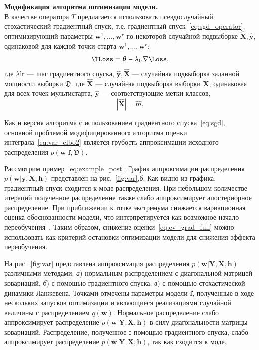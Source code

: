 \textbf{Модификация алгоритма оптимизации модели.} \\
В качестве оператора $T$ предлагается использовать псевдослучайный стохастический градиентный спуск, т.е. градиентный спуск~\eqref{eq:sgd_operator}, оптимизирующий параметры $\mathbf{w}^1,\dots,\mathbf{w}^r$ по некоторой случайной подвыборке $\hat{\mathbf{X}}, \hat{\mathbf{y}}$, одинаковой для каждой точки старта $\mathbf{w}^1,\dots,\mathbf{w}^r$:
\[
    \TLoss = \boldsymbol{\theta} - \lambda_{\text{lr}}\nabla \Loss,
\]
где $\lambda{\text{lr}}$ --- шаг градиентного спуска, $\hat{\mathbf{y}}, \hat{\mathbf{X}}$ --- случайная подвыборка заданной мощности выборки $\mathfrak{D}$.
где $\hat{\mathbf{X}}$ --- случайная подвыборка выборки ${\mathbf{X}}$, одинаковая для всех точек мультистарта, $\hat{\mathbf{y}}$ --- соответствующие метки классов, $$|\hat{\mathbf{X}}| = \hat{m}.$$

Как и версия алгоритма с использованием градиентного спуска~\eqref{eq:sgd}, основной проблемой модифицированного алгоритма оценки интеграла~\eqref{eq:var_elbo2} является грубость аппроксимации исходного распределения $p(\mathbf{w}|\mathbf{f},\mathfrak{D})$.

Рассмотрим пример~\eqref{eq:example_post}.
График аппроксимации распределения $p(\mathbf{w}|\mathbf{y}, \mathbf{X}, \mathbf{h})$ представлен на рис.~\ref{fig:var},\textit{б}.
Как видно из графика, градиентный спуск сходится к моде распределения. При небольшом количестве итераций полученное распределение также слабо аппроксимирует апостериорное распределение. {При приближении к точке экстремума снижается вариационная оценка обоснованности модели, что  интерпретируется как возможное начало переобучения~\cite{early}. Таким образом, снижение оценки~\eqref{eq:ev_grad_full} можно использовать как критерий остановки оптимизации модели для снижения эффекта переобучения.  }

На рис.~\ref{fig:var} представлена  {аппроксимация распределения $p(\mathbf{w}|\mathbf{Y}, \mathbf{X}, \mathbf{h})$ различными методами: \textit{а}) нормальным распределением с диагональной матрицей ковариаций, \textit{б}) с помощью градиентного спуска, \textit{в}) с помощью стохастической динамики Ланжевена. Точками отмечены параметры модели $\mathbf{f}$, полученные в ходе нескольких запусков оптимизации и являющиеся реализациями случайной величины с распределением $q(\mathbf{w})$. Нормальное распределение слабо аппроксимирует распределение $p(\mathbf{w}|\mathbf{Y}, \mathbf{X}, \mathbf{h})$ в силу диагональности матрицы ковариаций. Распределение, полученное с помощью градиентного спуска, слабо аппроксимирует распределение $p(\mathbf{w}|\mathbf{Y}, \mathbf{X}, \mathbf{h})$, так как сходится к моде.}





